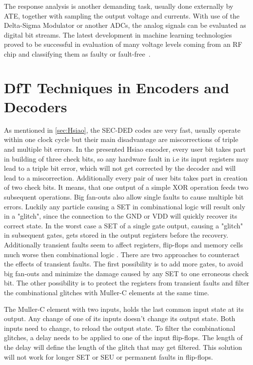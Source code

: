 The response analysis is another demanding task, usually done externally by ATE, together with sampling the output voltage and currents. With use of the Delta-Sigma Modulator or another ADCs, the analog signals can be evaluated as digital bit streams. The latest development in machine learning technologies proved to be successful in evaluation of many voltage levels coming from an RF chip and classifying them as faulty or fault-free~\cite{art:neural}.

\section{DfT Techniques in Encoders and Decoders}\label{sec:dft}

As mentioned in \autoref{sec:Hsiao}, the SEC-DED codes are very fast, usually operate within one clock cycle but their main disadvantage are miscorrections of triple and multiple bit errors. In the presented Hsiao encoder, every user bit takes part in building of three check bits, so any hardware fault in i.e its input registers may lead to a triple bit error, which will not get corrected by the decoder and will lead to a miscorrection. Additionally every pair of user bits takes part in creation of two check bits. It means, that one output of a simple XOR operation feeds two subsequent operations. Big fan-outs also allow single faults to cause multiple bit errors. Luckily any particle causing a SET in combinational logic will result only in a "glitch", since the connection to the GND or VDD will quickly recover its correct state. In the worst case a SET of a single gate output, causing a "glitch" in subsequent gates, gets stored in the output registers before the recovery. Additionally transient faults seem to affect registers, flip-flops and memory cells much worse then combinational logic \cite{7,8}. There are two approaches to counteract the effects of transient faults. The first possibility is to add more gates, to avoid big fan-outs and minimize the damage caused by any SET to one erroneous check bit. The other possibility is to protect the registers from transient faults and filter the combinational glitches with Muller-C elements at the same time.

The Muller-C element with two inputs, holds the last common input state at its output. Any change of one of its inputs doesn't change its output state. Both inputs need to change, to reload the output state. To filter the combinational glitches, a delay needs to be applied to one of the input flip-flops. The length of the delay will define the length of the glitch that may get filtered. This solution will not work for longer SET or SEU or permanent faults in flip-flops\cite{4,5}.

